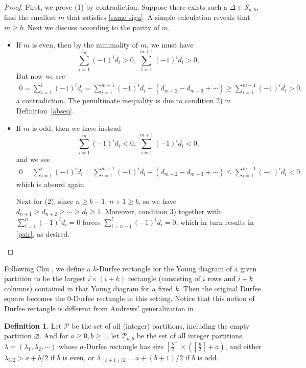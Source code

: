\documentclass[12pt,reqno]{amsart}
\numberwithin{equation}{section}
\theoremstyle{plain}
\theoremstyle{definition}
\newtheorem{Def}[theorem]{Definition}
\newcommand{\s}{\mathcal{S}}
\newcommand{\p}{\mathcal{P}}
\begin{document}
\begin{proof}
First, we prove (1) by contradiction. Suppose there exists such a $\Delta\in \s_{a,b}$, find the smallest $m$ that satisfies \eqref{same sign}. A simple calculation reveals that $m\ge b$. Next we discuss according to the parity of $m$.
\begin{itemize}
\item[I.] If $m$ is even, then by the minimality of $m$, we must have $$\sum_{i=1}^{m}(-1)^i d_i>0,\; \sum_{i=1}^{m+1}(-1)^i d_i>0,$$  But now we see
\begin{align*}
0=\sum_{i=1}^l (-1)^i d_i=\sum_{i=1}^{m+1} (-1)^i d_i+(d_{m+2}-d_{m+3}+\cdots)\ge \sum_{i=1}^{m+1} (-1)^i d_i>0,
\end{align*}
a contradiction. The penultimate inequality is due to condition 2) in Definition~\ref{abseq}.
\item[II.] If $m$ is odd, then we have instead $$\sum_{i=1}^{m}(-1)^i d_i<0,\; \sum_{i=1}^{m+1}(-1)^i d_i<0,$$ and we see
\begin{align*}
0=\sum_{i=1}^l (-1)^i d_i=\sum_{i=1}^{m+1} (-1)^i d_i-(d_{m+2}-d_{m+3}+\cdots)\le \sum_{i=1}^{m+1} (-1)^i d_i<0,
\end{align*}
which is absurd again.

Next for (2), since $n\ge b-1$, $n+1\ge b$, so we have $d_{n+1}\ge d_{n+2}\ge \cdots \ge d_l\ge 1$. Moreover, condition 3) together with $\sum_{i=1}^{n}(-1)^i d_i=0$ forces $\sum_{i=n+1}^l (-1)^i d_i=0$, which in turn results in \eqref{pair}, as desired.
\end{itemize}
\end{proof}

Following Chu \cite{Chu}, we define a $k$-Durfee rectangle for the Young diagram of a given partition to be the largest $i\times (i+k)$ rectangle (consisting of $i$ rows and $i+k$ columns) contained in that Young diagram for a fixed $k$. Then the original Durfee square becomes the $0$-Durfee rectangle in this setting. Notice that this notion of Durfee rectangle is different from Andrews' generalization in \cite{And}.

\begin{Def}\label{pab}
Let $\p$ be the set of all (integer) partitions, including the empty partition $\varnothing$. And for $a\ge 0, b\ge 1$, let $\p_{a,b}$ be the set of all integer partitions $\lambda=(\lambda_1,\lambda_2,\cdots)$ whose $a$-Durfee rectangle has size $\left\lceil \frac{b}{2}\right\rceil \times (\left\lceil \frac{b}{2}\right\rceil+a)$, and either $\lambda_{b/2}>a+b/2$ if $b$ is even, or $\lambda_{(b+1)/2}=a+(b+1)/2$ if $b$ is odd.
\end{Def}
\end{document}
